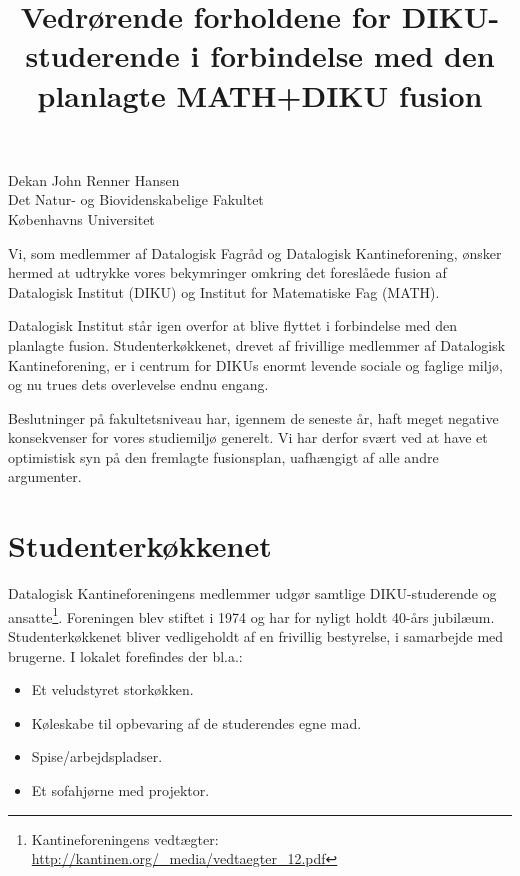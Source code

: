 \documentclass{article}
\begin{document}
\title{Vedrørende forholdene for DIKU-studerende i forbindelse med den planlagte MATH+DIKU fusion}
\date{}
\thispagestyle{fancy}

{\setlength{\parindent}{0pt} Dekan John Renner Hansen} \\
Det Natur- og Biovidenskabelige Fakultet \\
Københavns Universitet

{\let\newpage\relax\maketitle}

\thispagestyle{fancy}

\vspace{-25pt}

Vi, som medlemmer af Datalogisk Fagråd og Datalogisk Kantineforening, ønsker
hermed at udtrykke vores bekymringer omkring det foreslåede fusion af
Datalogisk Institut (DIKU) og Institut for Matematiske Fag (MATH).

Datalogisk Institut står igen overfor at blive flyttet i forbindelse med den
planlagte fusion. Studenterkøkkenet, drevet af frivillige medlemmer af
Datalogisk Kantineforening, er i centrum for DIKUs enormt levende sociale og
faglige miljø, og nu trues dets overlevelse endnu engang.

Beslutninger på fakultetsniveau har, igennem de seneste år, haft meget negative
konsekvenser for vores studiemiljø generelt. Vi har derfor svært ved at have et
optimistisk syn på den fremlagte fusionsplan, uafhængigt af alle andre
argumenter.

\section{Studenterkøkkenet}

Datalogisk Kantineforeningens medlemmer udgør samtlige DIKU-studerende og
ansatte\footnote{Kantineforeningens vedtægter:
\url{http://kantinen.org/_media/vedtaegter_12.pdf}}. Foreningen blev stiftet i
1974 og har for nyligt holdt 40-års jubilæum. Studenterkøkkenet bliver
vedligeholdt af en frivillig bestyrelse, i samarbejde med brugerne. I lokalet
forefindes der bl.a.:
\begin{itemize}
\itemsep0em
\item Et veludstyret storkøkken.
\item Køleskabe til opbevaring af de studerendes egne mad.
\item Spise/arbejdspladser.
\item Et sofahjørne med projektor.
\end{itemize}
\end{document}
